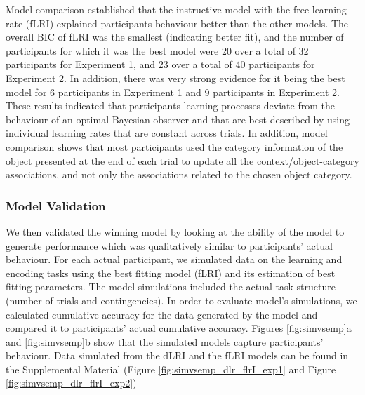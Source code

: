 \documentclass[a4paper,12pt]{article}
\begin{document}
Model comparison established that the instructive model with the free learning rate (fLRI) explained participants behaviour better than the other models. The overall BIC of fLRI was the smallest (indicating better fit), and the number of participants for which it was the best model were 20 over a total of 32 participants for Experiment 1, and 23 over a total of 40 participants for Experiment 2. In addition, there was very strong evidence for it being the best model for 6 participants in Experiment 1 and 9 participants in Experiment 2. %
These results indicated that participants learning processes deviate from the behaviour of an optimal Bayesian observer and that are best described by using individual learning rates that are constant across trials. In addition, model comparison shows that most participants used the category information of the object presented at the end of each trial to update all the context/object-category associations, and not only the associations related to the chosen object category.

\subsubsection{Model Validation}
We then validated the winning model by looking at the ability of the model to generate performance which was qualitatively similar to participants' actual behaviour. For each actual participant, we simulated data on the learning and encoding tasks using the best fitting model (fLRI) and its estimation of best fitting parameters. The model simulations included the actual task structure (number of trials and contingencies). In order to evaluate model's simulations, we calculated cumulative accuracy for the data generated by the model and compared it to participants' actual cumulative accuracy. Figures \ref{fig:simvsemp}a and \ref{fig:simvsemp}b show that the simulated models capture participants' behaviour. Data simulated from the dLRI and the fLRI models can be found in the Supplemental Material (Figure \ref{fig:simvsemp_dlr_flrI_exp1} and Figure \ref{fig:simvsemp_dlr_flrI_exp2})
\end{document}
